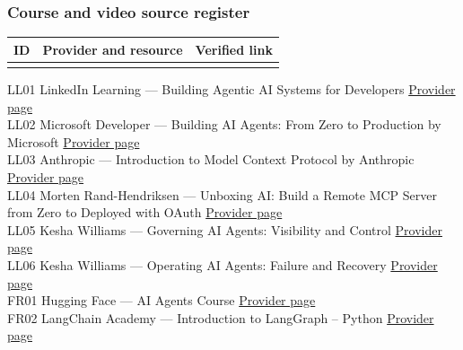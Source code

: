 \documentclass[
  10pt,
]{article}
\begin{document}
\subsubsection{Course and video source
register}\label{course-and-video-source-register}

\begin{longtable}[]{@{}lll@{}}
\toprule\noalign{}
ID & Provider and resource & Verified link \\
\midrule\noalign{}
\endhead
\bottomrule\noalign{}
\endlastfoot
\end{longtable}

LL01 \textbar{} LinkedIn Learning --- Building Agentic AI Systems for
Developers \textbar{}
\href{https://www.linkedin.com/learning/paths/building-agentic-ai-systems-for-developers}{Provider
page} \textbar{}\\
LL02 \textbar{} Microsoft Developer --- Building AI Agents: From Zero to
Production by Microsoft \textbar{}
\href{https://www.linkedin.com/learning/building-ai-agents-from-zero-to-production-by-microsoft}{Provider
page} \textbar{}\\
LL03 \textbar{} Anthropic --- Introduction to Model Context Protocol by
Anthropic \textbar{}
\href{https://www.linkedin.com/learning/introduction-to-model-context-protocol-by-anthropic}{Provider
page} \textbar{}\\
LL04 \textbar{} Morten Rand-Hendriksen --- Unboxing AI: Build a Remote
MCP Server from Zero to Deployed with OAuth \textbar{}
\href{https://www.linkedin.com/learning/unboxing-ai-build-a-remote-mcp-server-from-zero-to-deployed-with-oauth}{Provider
page} \textbar{}\\
LL05 \textbar{} Kesha Williams --- Governing AI Agents: Visibility and
Control \textbar{}
\href{https://www.linkedin.com/learning/governing-ai-agents-visibility-and-control}{Provider
page} \textbar{}\\
LL06 \textbar{} Kesha Williams --- Operating AI Agents: Failure and
Recovery \textbar{}
\href{https://www.linkedin.com/learning/operating-ai-agents-failure-and-recovery}{Provider
page} \textbar{}\\
FR01 \textbar{} Hugging Face --- AI Agents Course \textbar{}
\href{https://huggingface.co/learn/agents-course/unit0/introduction}{Provider
page} \textbar{}\\
FR02 \textbar{} LangChain Academy --- Introduction to LangGraph --
Python \textbar{}
\href{https://academy.langchain.com/courses/intro-to-langgraph}{Provider
page} \textbar{}\\
\end{document}
